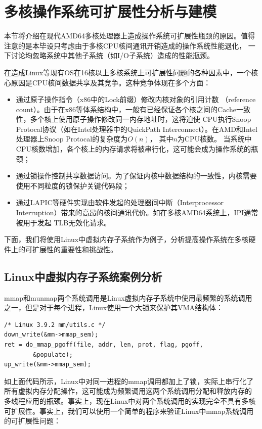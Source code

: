 
\chapter{多核操作系统可扩展性分析与建模}

本节将介绍在现代AMD64多核处理器上造成操作系统可扩展性瓶颈的原因。值得注意的是本毕设只考虑由于多核CPU核间通讯开销造成的操作系统性能退化，
一下讨论均忽略系统中其他子系统（如I/O子系统）造成的性能瓶颈。

在造成Linux等现有OS在16核以上多核系统上可扩展性问题的各种因素中，一个核心原因是CPU核间数据共享及其竞争。这种竞争体现在多个方面：

\begin{itemize}
\item 通过原子操作指令（x86中的Lock前缀）修改内核对象的引用计数
（reference count）。由于在x86等体系结构中，一般有已经保证各个核之间的Cache一致性，多个核上使用原子操作修改同一内存地址时，这将迫使
CPU执行Snoop Protocal协议（如在Intel处理器中的QuickPath Interconnect）。在AMD和Intel处理器上Snoop Protocal的复杂度为$O(n)$\cite{intelquickpath}，
其中$n$为CPU核数。
当系统中CPU核数增加，各个核上的内存请求将被串行化，这可能会成为操作系统的瓶颈；
\item 通过锁操作控制共享数据访问。为了保证内核中数据结构的一致性，内核需要使用不同粒度的锁保护关键代码段；
\item 通过LAPIC等硬件实现由软件发起的处理器间中断（Interprocessor Interruption）带来的高昂的核间通讯代价。如在多核AMD64系统上，IPI通常被用于发起
TLB无效化请求。
\end{itemize}

下面，我们将使用Linux中虚拟内存子系统作为例子，分析提高操作系统在多核硬件上的可扩展性的重要性和挑战性。

\section{Linux中虚拟内存子系统案例分析}

mmap和munmap两个系统调用是Linux虚拟内存子系统中使用最频繁的系统调用之一，但是对于每个进程，Linux使用一个大锁来保护其VMA结构体：

\begin{lstlisting}
/* Linux 3.9.2 mm/utils.c */
down_write(&mm->mmap_sem);
ret = do_mmap_pgoff(file, addr, len, prot, flag, pgoff,
		&populate);
up_write(&mm->mmap_sem);
\end{lstlisting}

如上面代码所示，Linux中对同一进程的mmap调用都加上了锁，实际上串行化了所有虚拟内存分配操作，这可能成为频繁调用这两个系统调用分配和释放内存的
多线程应用的瓶颈。事实上，现在Linux中对两个系统调用的实现完全不具有多核可扩展性。事实上，我们可以使用一个简单的程序来验证Linux中mmap系统调用的可扩展性问题：

